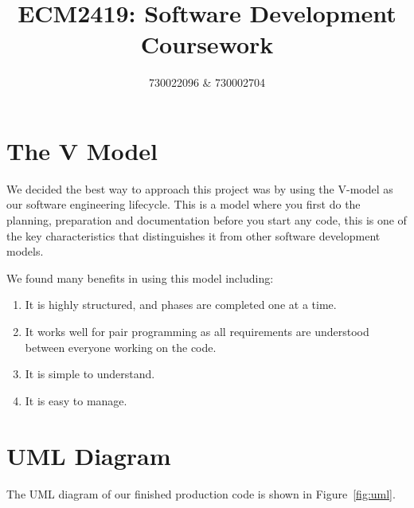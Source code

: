 \documentclass{article}
\title{ECM2419: Software Development Coursework}
\author{730022096 \& 730002704}
\date{}
\begin{document}
    \maketitle


    \section{The V Model}
    We decided the best way to approach this project was by using the V-model as our software engineering lifecycle.
    This is a model where you first do the planning, preparation and documentation before you start any code, this is one of the key characteristics that distinguishes it from other software development models.

    We found many benefits in using this model including:
    \begin{enumerate}
        \item It is highly structured, and phases are completed one at a time.
        \item It works well for pair programming as all requirements are understood between everyone working on the code.
        \item It is simple to understand.
        \item It is easy to manage.
    \end{enumerate}


    \section{UML Diagram}
    The UML diagram of our finished production code is shown in Figure~\ref{fig:uml}.
\end{document}
